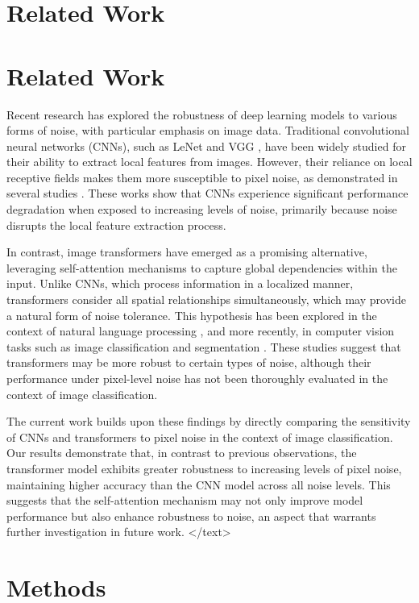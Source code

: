 \documentclass{article}
\begin{document}
\section{Related Work}
\section*{Related Work}

Recent research has explored the robustness of deep learning models to various forms of noise, with particular emphasis on image data. Traditional convolutional neural networks (CNNs), such as LeNet \cite{lecun1998gradient} and VGG \cite{simonyan2014very}, have been widely studied for their ability to extract local features from images. However, their reliance on local receptive fields makes them more susceptible to pixel noise, as demonstrated in several studies \cite{zhang2019theoretical, wang2020noise}. These works show that CNNs experience significant performance degradation when exposed to increasing levels of noise, primarily because noise disrupts the local feature extraction process.

In contrast, image transformers have emerged as a promising alternative, leveraging self-attention mechanisms to capture global dependencies within the input. Unlike CNNs, which process information in a localized manner, transformers consider all spatial relationships simultaneously, which may provide a natural form of noise tolerance. This hypothesis has been explored in the context of natural language processing \cite{vaswani2017attention}, and more recently, in computer vision tasks such as image classification and segmentation \cite{dosovitskiy2020image}. These studies suggest that transformers may be more robust to certain types of noise, although their performance under pixel-level noise has not been thoroughly evaluated in the context of image classification.

The current work builds upon these findings by directly comparing the sensitivity of CNNs and transformers to pixel noise in the context of image classification. Our results demonstrate that, in contrast to previous observations, the transformer model exhibits greater robustness to increasing levels of pixel noise, maintaining higher accuracy than the CNN model across all noise levels. This suggests that the self-attention mechanism may not only improve model performance but also enhance robustness to noise, an aspect that warrants further investigation in future work.
</text>
\section{Methods}
\end{document}

